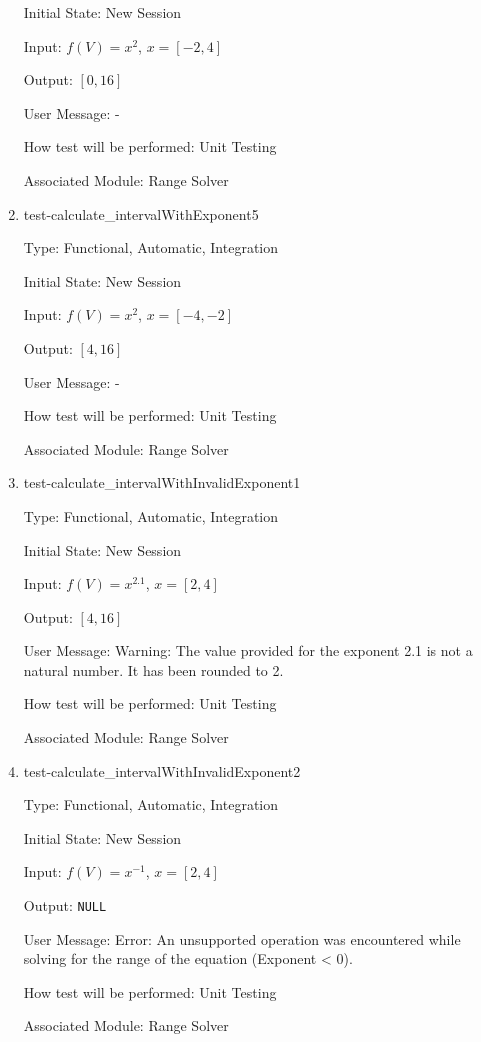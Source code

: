\documentclass[12pt, titlepage]{article}
\begin{document}
\begin{enumerate}
	Initial State: New Session
	
	Input: $f(V) = x^2$, $x = [-2,4]$
	
	Output: $[0,16]$
	
	User Message: - 
	
	How test will be performed: Unit Testing
	
	Associated Module: Range Solver\\
	
	\item{test-calculate\_intervalWithExponent5}
	
	Type: Functional, Automatic, Integration
	
	Initial State: New Session
	
	Input: $f(V) = x^2$, $x = [-4,-2]$
	
	Output: $[4,16]$
	
	User Message: - 
	
	How test will be performed: Unit Testing
	
	Associated Module: Range Solver\\
	
	\item{test-calculate\_intervalWithInvalidExponent1}
	
	Type: Functional, Automatic, Integration
	
	Initial State: New Session
	
	Input: $f(V) = x^{2.1}$, $x = [2,4]$
	
	Output: $[4,16]$
	
	User Message: Warning: The value provided for the exponent 2.1 is not a 
	natural number. It has been rounded to 2.
	
	How test will be performed: Unit Testing
	
	Associated Module: Range Solver\\
	
	\item{test-calculate\_intervalWithInvalidExponent2}
	
	Type: Functional, Automatic, Integration
	
	Initial State: New Session
	
	Input: $f(V) = x^{-1}$, $x = [2,4]$
	
	Output: \texttt{NULL}
	
	User Message: Error: An unsupported operation was encountered while solving 
	for the range of the equation (Exponent < 0).
	
	How test will be performed: Unit Testing
	
	Associated Module: Range Solver\\
	
\end{enumerate}
\end{document}
